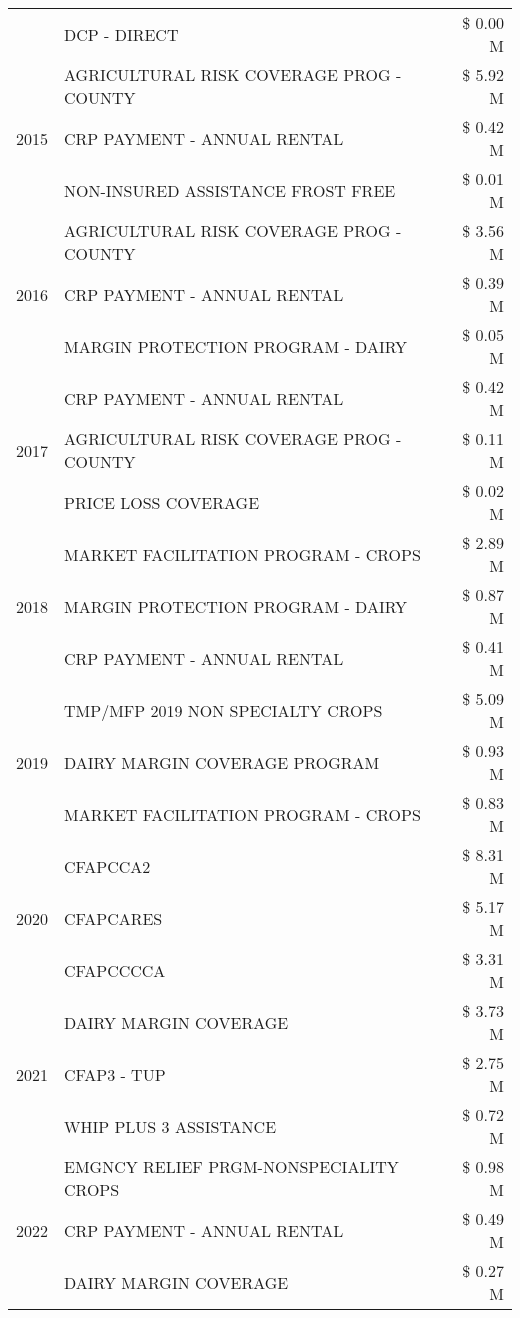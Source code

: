 \begin{tabular}{llr}
 & DCP - DIRECT & \$ 0.00 M \\
\cline{1-3}
\multirow[t]{3}{*}{2015} & AGRICULTURAL RISK COVERAGE PROG - COUNTY & \$ 5.92 M \\
 & CRP PAYMENT - ANNUAL RENTAL & \$ 0.42 M \\
 & NON-INSURED ASSISTANCE FROST FREE & \$ 0.01 M \\
\cline{1-3}
\multirow[t]{3}{*}{2016} & AGRICULTURAL RISK COVERAGE PROG - COUNTY & \$ 3.56 M \\
 & CRP PAYMENT - ANNUAL RENTAL & \$ 0.39 M \\
 & MARGIN PROTECTION PROGRAM - DAIRY & \$ 0.05 M \\
\cline{1-3}
\multirow[t]{3}{*}{2017} & CRP PAYMENT - ANNUAL RENTAL & \$ 0.42 M \\
 & AGRICULTURAL RISK COVERAGE PROG - COUNTY & \$ 0.11 M \\
 & PRICE LOSS COVERAGE & \$ 0.02 M \\
\cline{1-3}
\multirow[t]{3}{*}{2018} & MARKET FACILITATION PROGRAM - CROPS & \$ 2.89 M \\
 & MARGIN PROTECTION PROGRAM - DAIRY & \$ 0.87 M \\
 & CRP PAYMENT - ANNUAL RENTAL & \$ 0.41 M \\
\cline{1-3}
\multirow[t]{3}{*}{2019} & TMP/MFP 2019 NON SPECIALTY CROPS & \$ 5.09 M \\
 & DAIRY MARGIN COVERAGE PROGRAM & \$ 0.93 M \\
 & MARKET FACILITATION PROGRAM - CROPS & \$ 0.83 M \\
\cline{1-3}
\multirow[t]{3}{*}{2020} & CFAPCCA2 & \$ 8.31 M \\
 & CFAPCARES & \$ 5.17 M \\
 & CFAPCCCCA & \$ 3.31 M \\
\cline{1-3}
\multirow[t]{3}{*}{2021} & DAIRY MARGIN COVERAGE & \$ 3.73 M \\
 & CFAP3 - TUP & \$ 2.75 M \\
 & WHIP PLUS 3 ASSISTANCE & \$ 0.72 M \\
\cline{1-3}
\multirow[t]{3}{*}{2022} & EMGNCY RELIEF PRGM-NONSPECIALITY CROPS & \$ 0.98 M \\
 & CRP PAYMENT - ANNUAL RENTAL & \$ 0.49 M \\
 & DAIRY MARGIN COVERAGE & \$ 0.27 M \\
\cline{1-3}
\bottomrule
\end{tabular}
